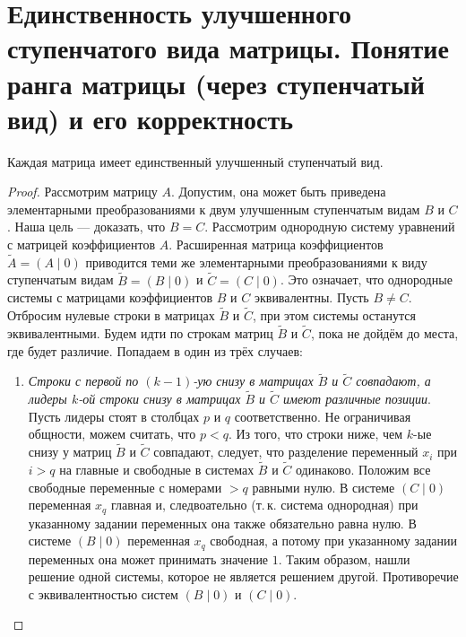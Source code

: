 \section{Единственность улучшенного ступенчатого вида матрицы. Понятие ранга матрицы (через ступенчатый вид) и его корректность}

\begin{theorem}
    Каждая матрица имеет единственный улучшенный ступенчатый вид.
\end{theorem}

\begin{proof}
    Рассмотрим матрицу $A$. Допустим, она может быть приведена элементарными преобразованиями к двум улучшенным ступенчатым видам $B$ и $C$. Наша цель --- доказать, что $B = C$. Рассмотрим однородную систему уравнений с матрицей коэффициентов $A$. Расширенная матрица коэффициентов $\widetilde{A} = (A \mid 0)$ приводится теми же элементарными преобразованиями к виду ступенчатым видам $\widetilde{B} = (B \mid 0)$ и $\widetilde{C} = (C \mid 0)$. Это означает, что однородные системы с матрицами коэффициентов $B$ и $C$ эквивалентны. Пусть $B \ne C$. Отбросим нулевые строки в матрицах $\widetilde{B}$ и $\widetilde{C}$, при этом системы останутся эквивалентными. Будем идти по строкам матриц $\widetilde{B}$ и $\widetilde{C}$, пока не дойдём до места, где будет различие. Попадаем в один из трёх случаев:
    \begin{enumerate}
        \item \textit{Строки с первой по $(k - 1)$-ую снизу в матрицах $\widetilde{B}$ и $\widetilde{C}$ совпадают, а лидеры $k$-ой строки снизу в матрицах $\widetilde{B}$ и $\widetilde{C}$ имеют различные позиции}. Пусть лидеры стоят в столбцах $p$ и $q$ соответственно. Не ограничивая общности, можем считать, что $p < q$. Из того, что строки ниже, чем $k$-ые снизу у матриц $\widetilde{B}$ и $\widetilde{C}$ совпадают, следует, что разделение переменный $x_i$ при $i > q$ на главные и свободные в системах $\widetilde{B}$ и $\widetilde{C}$ одинаково. Положим все свободные переменные с номерами $> q$ равными нулю. В системе $(C \mid 0)$ переменная $x_q$ главная и, следвоательно (т.\,к. система однородная) при указанному задании переменных она также обязательно равна нулю. В системе $(B \mid 0)$ переменная $x_q$ свободная, а потому при указанному задании переменных она может принимать значение $1$. Таким образом, нашли решение одной системы, которое не является решением другой. Противоречие с эквивалентностью систем $(B \mid 0)$ и $(C \mid 0)$.

\end{enumerate}
\end{proof}
